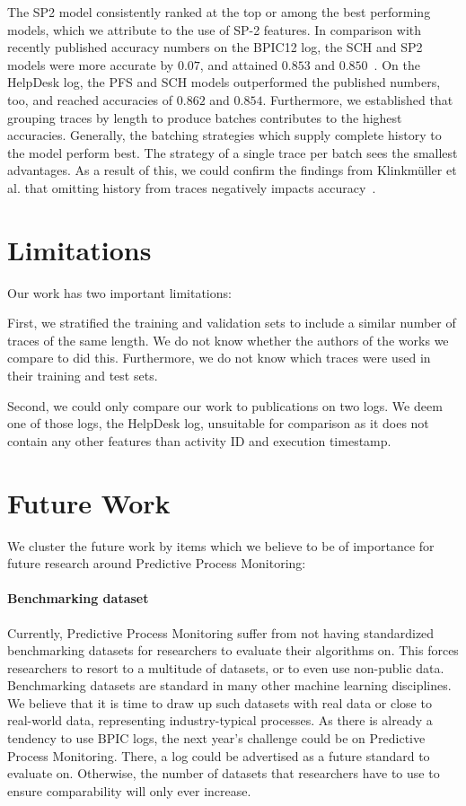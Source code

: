 The SP2 model consistently ranked at the top or among the best performing models, which we attribute to the use of SP-2 features. In comparison with recently published accuracy numbers on the BPIC12 log, the SCH and SP2 models were more accurate by $0.07$, and attained $0.853$ and $0.850$~\cite{boehmer2018probability, evermann2016}.
On the HelpDesk log, the PFS and SCH models outperformed the published numbers, too, and reached accuracies of $0.862$ and $0.854$.
Furthermore, we established that grouping traces by length to produce batches contributes to the highest accuracies.
Generally, the batching strategies which supply complete history to the model perform best.
The strategy of a single trace per batch sees the smallest advantages.
As a result of this, we could confirm the findings from Klinkmüller et al. that omitting history from traces negatively impacts accuracy~\cite{klinkmuller2018reliablemonitoring}.

\section{Limitations}\label{sec:conclusion:limitations}
Our work has two important limitations:

First, we stratified the training and validation sets to include a similar number of traces of the same length.
We do not know whether the authors of the works we compare to did this.
Furthermore, we do not know which traces were used in their training and test sets.

Second, we could only compare our work to publications on two logs.
We deem one of those logs, the HelpDesk log, unsuitable for comparison as it does not contain any other features than activity ID and execution timestamp.

\section{Future Work}\label{sec:conclusion:future-work}
We cluster the future work by items which we believe to be of importance for future research around Predictive Process Monitoring:

\paragraph{Benchmarking dataset} Currently, Predictive Process Monitoring suffer from not having standardized benchmarking datasets for researchers to evaluate their algorithms on.
This forces researchers to resort to a multitude of datasets, or to even use non-public data.
Benchmarking datasets are standard in many other machine learning disciplines.
We believe that it is time to draw up such datasets with real data or close to real-world data, representing industry-typical processes.
As there is already a tendency to use BPIC logs, the next year's challenge could be on Predictive Process Monitoring.
There, a log could be advertised as a future standard to evaluate on.
Otherwise, the number of datasets that researchers have to use to ensure comparability will only ever increase.

